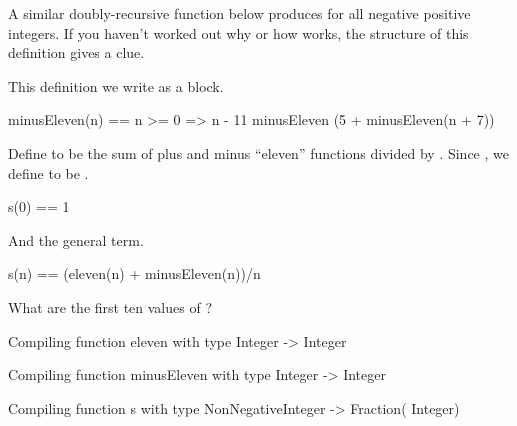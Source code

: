 A similar doubly-recursive function below produces  for all
negative positive integers.
If you haven't worked out why or how  works,
the structure of this definition gives a clue.
\begin{xtc}
\begin{xtccomment}
This definition we write as a block.
\end{xtccomment}
\begin{spadsrc}
minusEleven(n) ==
  n >= 0 => n - 11
  minusEleven (5 + minusEleven(n + 7))
\end{spadsrc}
\end{xtc}
\begin{xtc}
\begin{xtccomment}
Define  to be the
sum of plus and minus ``eleven'' functions divided by .
Since , we define  to be .
\end{xtccomment}
\begin{spadsrc}
s(0) == 1
\end{spadsrc}
\end{xtc}
\begin{xtc}
\begin{xtccomment}
And the general term.
\end{xtccomment}
\begin{spadsrc}
s(n) == (eleven(n) + minusEleven(n))/n
\end{spadsrc}
\end{xtc}
\begin{xtc}
\begin{xtccomment}
What are the first ten values of ?
\end{xtccomment}
\begin{spadsrc}
[s(n) for n in 0..]
\end{spadsrc}
\begin{MessageOutput}
   Compiling function eleven with type Integer -> Integer 
\end{MessageOutput}
\begin{MessageOutput}
   Compiling function minusEleven with type Integer -> Integer 
\end{MessageOutput}
\begin{MessageOutput}
   Compiling function s with type NonNegativeInteger -> Fraction(
      Integer) 
\end{MessageOutput}
\begin{TeXOutput}
\begin{fricasmath}{6}
%
\end{fricasmath}
\end{TeXOutput}
\end{xtc}
